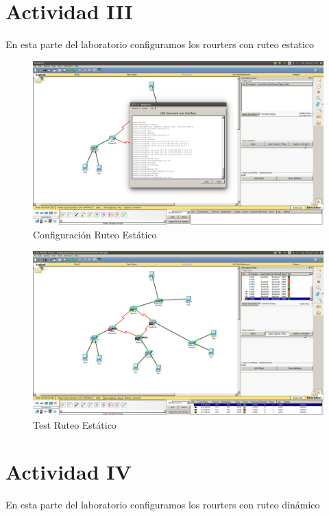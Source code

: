 \documentclass[spanish]{udpreport}
\begin{document}
\section{Actividad III}

En esta parte del laboratorio configuramos los rourters con ruteo estatico

\begin{figure}[H]
	\centering
	\includegraphics[scale=.25]{imagenes/ruteo_estatico.png}
	\caption{Configuración Ruteo Estático}
	\label{fig:Figura 4.1}
\end{figure}

\begin{figure}[H]
	\centering
	\includegraphics[scale=.25]{imagenes/test_restatico.png}
	\caption{Test Ruteo Estático}
	\label{fig:Figura 4.2}
\end{figure}

\section{Actividad IV}

En esta parte del laboratorio configuramos los rourters con ruteo dinámico
\end{document}
